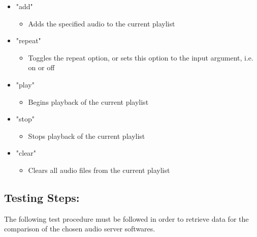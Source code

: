 \documentclass[11pt,a4paper,headinclude=false,footinclude=false]{scrreprt}
\begin{document}
\begin{itemize}
 \item "add"
 \begin{itemize}
  \item Adds the specified audio to the current playlist
 \end{itemize}
 \item "repeat"
 \begin{itemize}
  \item Toggles the repeat option, or sets this option to the input argument, i.e. on
   or off
  \end{itemize}
 \item "play"
 \begin{itemize}
  \item Begins playback of the current playlist
 \end{itemize}
 \item "stop"
 \begin{itemize}
  \item Stops playback of the current playlist
 \end{itemize}
 \item "clear"
 \begin{itemize}
  \item Clears all audio files from the current playlist
 \end{itemize}
\end{itemize}

\subsection{Testing Steps:}\label{testing-steps}

The following test procedure must be followed in order to retrieve data
for the comparison of the chosen audio server softwares.
\end{document}
